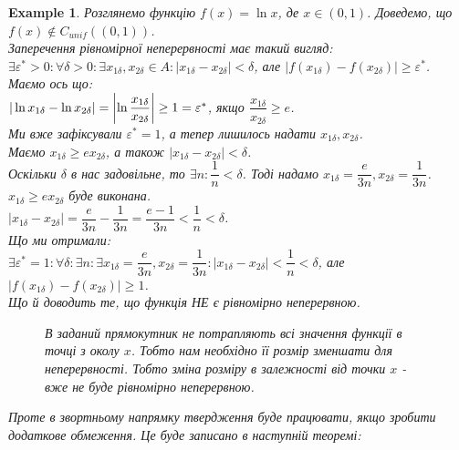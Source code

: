 \documentclass[a4paper, 14pt]{article}
\theoremstyle{theoremdd}
\theoremstyle{theoremdd}
\theoremstyle{theoremdd}
\theoremstyle{theoremdd}
\newtheorem{example}[theorem]{Example}
\theoremstyle{theoremdd}
\theoremstyle{theoremdd}
\theoremstyle{theoremdd}
\theoremstyle{theoremdd}
\begin{document}
\begin{example}
Розглянемо функцію $f(x) = \ln x$, де $x \in (0,1)$. Доведемо, що $f(x) \not\in C_{unif}((0,1))$.\\
Заперечення рівномірної неперервності має такий вигляд:\\
$\exists \varepsilon^* > 0: \forall \delta > 0: \exists x_{1 \delta},x_{2 \delta} \in A: |x_{1 \delta}-x_{2 \delta}|<\delta$, але $|f(x_{1 \delta}) - f(x_{2 \delta})| \geq \varepsilon^*$.\\
Маємо ось що:\\
$|\ln x_{1 \delta} - \ln x_{2 \delta}| = \abs{\ln \dfrac{x_{1 \delta}}{x_{2 \delta}}} \geq 1 = \varepsilon^*$, якщо $\dfrac{x_{1 \delta}}{x_{2 \delta}} \geq e$.\\
Ми вже зафіксували $\varepsilon^* = 1$, а тепер лишилось надати $x_{1 \delta}, x_{2 \delta}$.\\
Маємо $x_{1 \delta} \geq e x_{2 \delta}$, а також $|x_{1 \delta} - x_{2 \delta}| < \delta$.\\
Оскільки $\delta$ в нас задовільне, то $\exists n: \dfrac{1}{n} < \delta$. Тоді надамо $x_{1 \delta} = \dfrac{e}{3n}, x_{2 \delta} = \dfrac{1}{3n}$.
$x_{1 \delta} \geq e x_{2 \delta}$ буде виконана.\\
$|x_{1 \delta} - x_{2 \delta}| = \dfrac{e}{3n} - \dfrac{1}{3n} = \dfrac{e-1}{3n} < \dfrac{1}{n} < \delta$.\\
Що ми отримали:\\
$\exists \varepsilon^* = 1: \forall \delta: \exists n: \exists x_{1 \delta} = \dfrac{e}{3n}, x_{2 \delta} = \dfrac{1}{3n}: |x_{1 \delta} - x_{2 \delta}| < \dfrac{1}{n} < \delta$, але $|f(x_{1\delta}) - f(x_{2 \delta})| \geq 1$.\\
Що й доводить те, що функція НЕ є рівномірно неперервною.
\begin{figure}[H]
\centering
{}
\caption*{В заданий прямокутник не потрапляють всі значення функції в точці з околу $x$. Тобто нам необхідно її розмір зменшати для неперервності. Тобто зміна розміру в залежності від точки $x$ - вже не буде рівномірно неперервною.}
\end{figure}

Проте в звортньому напрямку твердження буде працювати, якщо зробити додаткове обмеження. Це буде записано в наступній теоремі:
\end{example}
\end{document}
